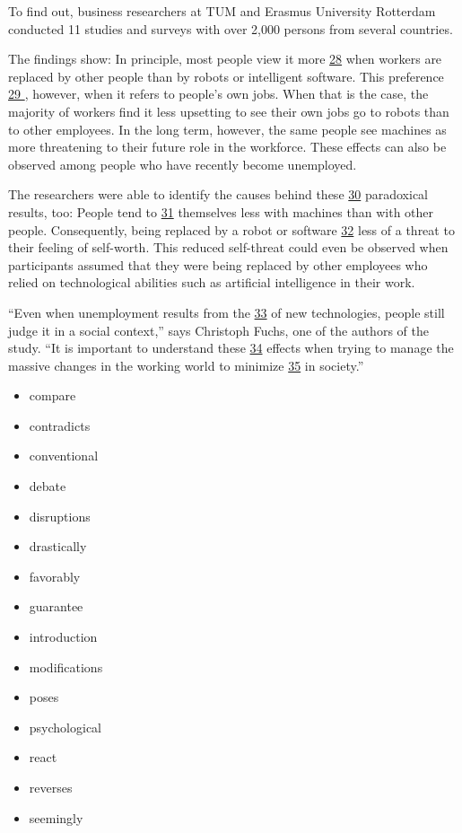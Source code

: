 \documentclass[UTF8,11pt]{ctexart}
\begin{document}
To find out, business researchers at TUM and Erasmus University Rotterdam conducted 11 studies and surveys with over 2,000 persons from several countries.


The findings show: In principle, most people view it more \uline{28} when workers are replaced by other people than by robots or intelligent software. This preference \uline{29 }, however, when it refers to people’s own jobs. When that is the case, the majority of workers find it less upsetting to see their own jobs go to robots than to other employees. In the long term, however, the same people see machines as more threatening to their future role in the workforce. These effects can also be observed among people who have recently become unemployed.


The researchers were able to identify the causes behind these \uline{30} paradoxical results, too: People tend to \uline{31} themselves less with machines than with other people. Consequently, being replaced by a robot or software \uline{32} less of a threat to their feeling of self-worth. This reduced self-threat could even be observed when participants assumed that they were being replaced by other employees who relied on technological abilities such as artificial intelligence in their work.


“Even when unemployment results from the \uline{33} of new technologies, people still judge it in a social context,” says Christoph Fuchs, one of the authors of the study. “It is important to understand these \uline{34} effects when trying to manage the massive changes in the working world to minimize \uline{35} in society.”


\begin{itemize}[leftmargin=2em,itemsep=.2em,topsep=.4em]\item[A.] compare
\item[B.] contradicts
\item[C.] conventional
\item[D.] debate
\item[E.] disruptions
\item[F.] drastically
\item[G.] favorably
\item[H.] guarantee
\item[I.] introduction
\item[J.] modifications
\item[K.] poses
\item[L.] psychological
\item[M.] react
\item[N.] reverses
\item[O.] seemingly
\end{itemize}
\end{document}
